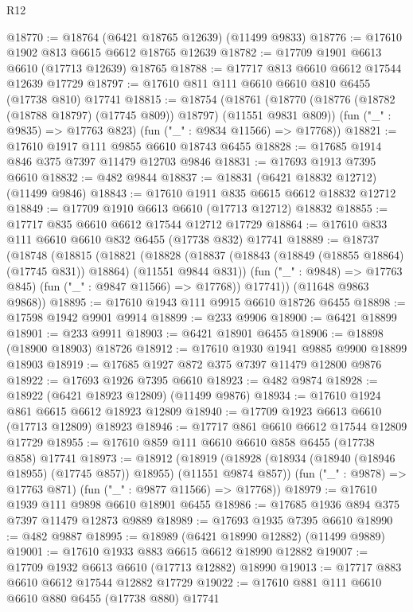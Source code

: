\begin{lexlean}{R12}
\begin{coremodule}
@18770 := @18764 (@6421 @18765 @12639) (@11499 @9833)
@18776 := @17610 @1902 @813 @6615 @6612 @18765 @12639
@18782 := @17709 @1901 @6613 @6610 (@17713 @12639) @18765
@18788 := @17717 @813 @6610 @6612 @17544 @12639 @17729
@18797 := @17610 @811 @111 @6610 @6610 @810 @6455 (@17738 @810) @17741
@18815 := @18754
    (@18761
      (@18770 (@18776 (@18782 (@18788 @18797) (@17745 @809)) @18797) (@11551 @9831 @809))
      (fun ("_" : @9835) => @17763 @823)
      (fun ("_" : @9834 @11566) => @17768))
@18821 := @17610 @1917 @111 @9855 @6610 @18743 @6455
@18828 := @17685 @1914 @846 @375 @7397 @11479 @12703 @9846
@18831 := @17693 @1913 @7395 @6610
@18832 := @482 @9844
@18837 := @18831 (@6421 @18832 @12712) (@11499 @9846)
@18843 := @17610 @1911 @835 @6615 @6612 @18832 @12712
@18849 := @17709 @1910 @6613 @6610 (@17713 @12712) @18832
@18855 := @17717 @835 @6610 @6612 @17544 @12712 @17729
@18864 := @17610 @833 @111 @6610 @6610 @832 @6455 (@17738 @832) @17741
@18889 := @18737
    (@18748
      (@18815
        (@18821
          (@18828
            (@18837 (@18843 (@18849 (@18855 @18864) (@17745 @831)) @18864) (@11551 @9844 @831))
            (fun ("_" : @9848) => @17763 @845)
            (fun ("_" : @9847 @11566) => @17768))
          @17741))
      (@11648 @9863 @9868))
@18895 := @17610 @1943 @111 @9915 @6610 @18726 @6455
@18898 := @17598 @1942 @9901 @9914
@18899 := @233 @9906
@18900 := @6421 @18899
@18901 := @233 @9911
@18903 := @6421 @18901 @6455
@18906 := @18898 (@18900 @18903) @18726
@18912 := @17610 @1930 @1941 @9885 @9900 @18899 @18903
@18919 := @17685 @1927 @872 @375 @7397 @11479 @12800 @9876
@18922 := @17693 @1926 @7395 @6610
@18923 := @482 @9874
@18928 := @18922 (@6421 @18923 @12809) (@11499 @9876)
@18934 := @17610 @1924 @861 @6615 @6612 @18923 @12809
@18940 := @17709 @1923 @6613 @6610 (@17713 @12809) @18923
@18946 := @17717 @861 @6610 @6612 @17544 @12809 @17729
@18955 := @17610 @859 @111 @6610 @6610 @858 @6455 (@17738 @858) @17741
@18973 := @18912
    (@18919
      (@18928 (@18934 (@18940 (@18946 @18955) (@17745 @857)) @18955) (@11551 @9874 @857))
      (fun ("_" : @9878) => @17763 @871)
      (fun ("_" : @9877 @11566) => @17768))
@18979 := @17610 @1939 @111 @9898 @6610 @18901 @6455
@18986 := @17685 @1936 @894 @375 @7397 @11479 @12873 @9889
@18989 := @17693 @1935 @7395 @6610
@18990 := @482 @9887
@18995 := @18989 (@6421 @18990 @12882) (@11499 @9889)
@19001 := @17610 @1933 @883 @6615 @6612 @18990 @12882
@19007 := @17709 @1932 @6613 @6610 (@17713 @12882) @18990
@19013 := @17717 @883 @6610 @6612 @17544 @12882 @17729
@19022 := @17610 @881 @111 @6610 @6610 @880 @6455 (@17738 @880) @17741

\end{coremodule}
\end{lexlean}

